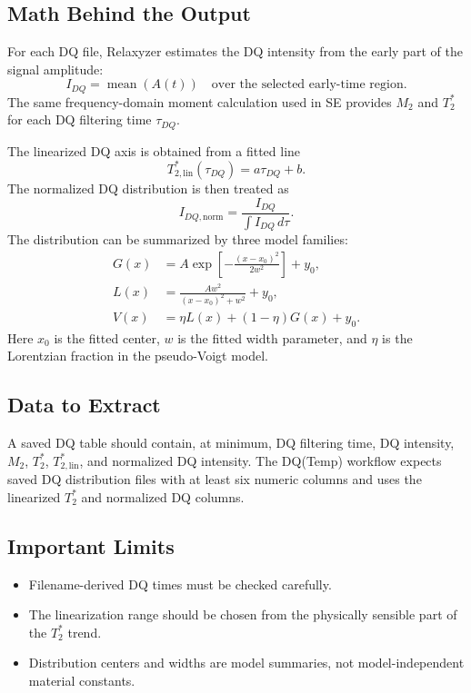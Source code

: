 \documentclass[11pt,a4paper]{article}
\newcommand{\Relaxyzer}{Relaxyzer}
\newcommand{\TtwoStar}{\ensuremath{T_2^{\ast}}}
\newcommand{\Mtwo}{\ensuremath{M_2}}
\newcommand{\TtwoStarLin}{\ensuremath{T_{2,\mathrm{lin}}^{\ast}}}
\begin{document}
\subsection{Math Behind the Output}
For each DQ file, \Relaxyzer{} estimates the DQ intensity from the early part of the signal amplitude:
\begin{equation}
I_{DQ}=\operatorname{mean}\left(A(t)\right)\quad\text{over the selected early-time region.}
\end{equation}
The same frequency-domain moment calculation used in SE provides \Mtwo{} and \TtwoStar{} for each DQ filtering time \(\tau_{DQ}\).

The linearized DQ axis is obtained from a fitted line
\begin{equation}
\TtwoStarLin(\tau_{DQ})=a\tau_{DQ}+b.
\end{equation}
The normalized DQ distribution is then treated as
\begin{equation}
I_{DQ,\mathrm{norm}}=\frac{I_{DQ}}{\int I_{DQ}\,d\tau}.
\end{equation}
The distribution can be summarized by three model families:
\begin{align}
G(x)&=A\exp\left[-\frac{(x-x_0)^2}{2w^2}\right]+y_0,\\
L(x)&=\frac{Aw^2}{(x-x_0)^2+w^2}+y_0,\\
V(x)&=\eta L(x)+(1-\eta)G(x)+y_0.
\end{align}
Here \(x_0\) is the fitted center, \(w\) is the fitted width parameter, and \(\eta\) is the Lorentzian fraction in the pseudo-Voigt model.


\subsection{Data to Extract}
A saved DQ table should contain, at minimum, DQ filtering time, DQ intensity, \Mtwo{}, \TtwoStar{}, \TtwoStarLin{}, and normalized DQ intensity. The DQ(Temp) workflow expects saved DQ distribution files with at least six numeric columns and uses the linearized \TtwoStar{} and normalized DQ columns.

\subsection{Important Limits}
\begin{itemize}
  \item Filename-derived DQ times must be checked carefully.
  \item The linearization range should be chosen from the physically sensible part of the \TtwoStar{} trend.
  \item Distribution centers and widths are model summaries, not model-independent material constants.
\end{itemize}
\end{document}
